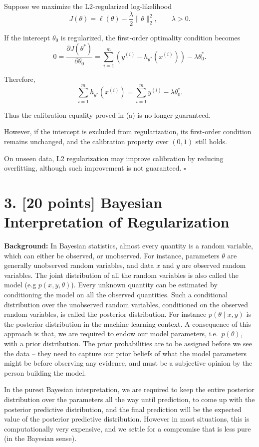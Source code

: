 \documentclass[11pt]{article}
\newcommand{\problem}[2]{\clearpage\section*{#1. #2}}
\begin{document}
Suppose we maximize the L2-regularized
log-likelihood
\[
J(\theta)
=
\ell(\theta)-\frac{\lambda}{2}\|\theta\|_2^2,
\qquad \lambda>0.
\]

If the intercept $\theta_0$ is regularized,
the first-order optimality condition becomes
\[
0=
\frac{\partial J(\theta^*)}{\partial\theta_0}
=
\sum_{i=1}^{m}
\left(y^{(i)}-h_{\theta^*}(x^{(i)})\right)
-\lambda\theta_0^*.
\]

Therefore,
\[
\boxed{
\sum_{i=1}^{m}h_{\theta^*}(x^{(i)})
=
\sum_{i=1}^{m}y^{(i)}
-\lambda\theta_0^*.
}
\]

Thus the calibration equality proved in (a)
is no longer guaranteed.

However, if the intercept is excluded from
regularization, its first-order condition
remains unchanged, and the calibration property
over $(0,1)$ still holds.

On unseen data, L2 regularization may improve
calibration by reducing overfitting, although
such improvement is not guaranteed.
\hfill$\square$






\problem{3}{[20 points] Bayesian Interpretation of Regularization}
\textbf{Background:} In Bayesian statistics, almost every quantity is a random variable, which can either be observed, or unobserved. For instance, parameters $\theta$ are generally unobserved random variables, and data $x$ and $y$ are observed random variables. The joint distribution of all the random variables is also called the model (e.g $p(x,y,\theta)$). Every unknown quantity can be estimated by conditioning the model on all the observed quantities. Such a conditional distribution over the unobserved random variables, conditioned on the observed random variables, is called the posterior distribution. For instance $p(\theta\mid x,y)$ is the posterior distribution in the machine learning context. A consequence of this approach is that, we are required to endow our model parameters, i.e.\ $p(\theta)$, with a prior distribution. The prior probabilities are to be assigned before we see the data -- they need to capture our prior beliefs of what the model parameters might be before observing any evidence, and must be a subjective opinion by the person building the model.

In the purest Bayesian interpretation, we are required to keep the entire posterior distribution over the parameters all the way until prediction, to come up with the posterior predictive distribution, and the final prediction will be the expected value of the posterior predictive distribution. However in most situations, this is computationally very expensive, and we settle for a compromise that is less pure (in the Bayesian sense).
\end{document}
